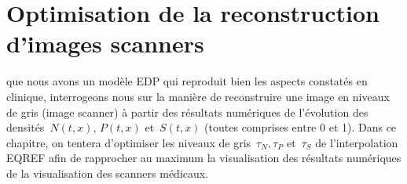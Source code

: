 \documentclass[main.tex]{subfiles}
\begin{document}
\chapter{Optimisation de la reconstruction d'images scanners \label{chap:optim_grey}}
 que nous avons un modèle EDP qui reproduit bien les aspects constatés en clinique, interrogeons nous sur la manière de reconstruire une image en niveaux de gris (image scanner) à partir des résultats numériques \ie de l'évolution des densités~$N(t,x)$, $P(t,x)$ et~$S(t,x)$ (toutes comprises entre 0 et 1). Dans ce chapitre, on tentera d'optimiser les niveaux de gris~$\tau_N, \tau_P$ et~$\tau_S$ de l'interpolation EQREF  afin de rapprocher au maximum la visualisation des résultats numériques de la visualisation des scanners médicaux.
\end{document}
